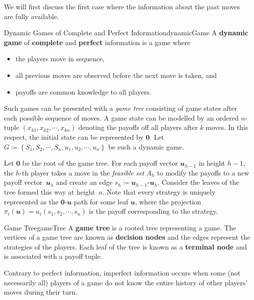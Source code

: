 \documentclass[math]{amznotes}
\theoremstyle{remark}
\begin{document}
We will first discuss the first case where the information about the past moves are fully available.
\begin{dfnbox}{Dynamic Games of Complete and Perfect Information}{dynamicGame}
    A {\color{red} \textbf{dynamic game}} of {\color{red} \textbf{complete}} and {\color{red} \textbf{perfect}} information is a game where 
    \begin{itemize}
        \item the players move in sequence,
        \item all previous moves are observed before the next move is taken, and
        \item payoffs are common knowledge to all players.
    \end{itemize}
\end{dfnbox}
Such games can be presented with a \textit{game tree} consisting of game states after each possible sequence of moves. A game state can be modelled by an ordered $n$-tuple $\left(x_{k1}, x_{k2}, \cdots, x_{kn}\right)$ denoting the payoffs off all players after $k$ moves. In this respect, the initial state can be represented by $\mathbf{0}$. Let $G \coloneqq \left\{S_1, S_2, \cdots, S_n, u_1, u_2, \cdots, u_n\right\}$ be such a dynamic game. 

Let $\mathbf{0}$ be the root of the game tree. For each payoff vector $\mathbfit{u}_{h - 1}$ in height $h - 1$, the $h$-th player takes a move in the \textit{feasible set} $A_h$ to modify the payoffs to a new payoff vector~$\mathbfit{u}_h$ and create an edge $s_h \coloneqq \mathbfit{u}_{h - 1}$-$\mathbfit{u}_h$. Consider the leaves of the tree formed this way at height~$n$. Note that every strategy is uniquely represented as the $\mathbf{0}$-$\mathbfit{u}$ path for some leaf $\mathbfit{u}$, where the projection~$\pi_i\left(\mathbfit{u}\right) = u_i\left(s_1, s_2, \cdots, s_n\right)$ is the payoff corresponding to the strategy.
\begin{dfnbox}{Game Tree}{gameTree}
    A {\color{red} \textbf{game tree}} is a rooted tree representing a game. The vertices of a game tree are known as {\color{red} \textbf{decision nodes}} and the edges represent the strategies of the players. Each leaf of the tree is known as a {\color{red} \textbf{terminal node}} and is associated with a payoff tuple. 
\end{dfnbox}
Contrary to perfect information, imperfect information occurs when some (not necessarily all) players of a game do not know the entire history of other players' moves during their turn.
\end{document}

